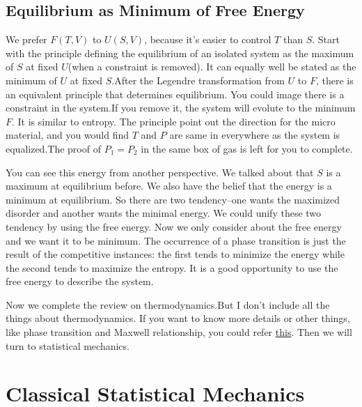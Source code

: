 \documentclass[10pt]{article}
\begin{document}
	\subsection{Equilibrium as Minimum of Free Energy}\label{Equilibrium as Minimum of Free Energy}
	We prefer $F(T,V)$ to $U(S,V)$, because it's easier to control $T$ than $S$. Start with the principle defining the equilibrium of an isolated system as the maximum of $S$ at fixed $U$(when a constraint is removed). It can equally well be stated as the minimum of $U$ at fixed $S$.After the Legendre transformation from $U$ to $F$, there is an equivalent principle that determines equilibrium. You could image there is a constraint in the system.If you remove it, the system will evolute to the minimum $F$. It is similar to entropy. The principle point out the direction for the micro material, and you would find $T$ and $P$ are same in everywhere as the system is equalized.The proof of $P_1=P_2$ in the same box of gas is left for you to complete.
	
	You can see this energy from another perspective. We talked about that $S$ is a maximum at equilibrium before. We also have the belief that the energy is a minimum at equilibrium. So there are two tendency--one wants the maximized disorder and another wants the minimal energy. We could unify these two tendency by using the free energy. Now we only consider about the free energy and we want it to be minimum. The occurrence of a phase transition is just the result of the competitive
	instances: the first tends to minimize the energy while the second tends to maximize the entropy. It is a good opportunity to use the free energy to describe the system.
	
	Now we complete the review on thermodynamics.But I don't include all the things about thermodynamics. If you want to know more details or other things, like phase transition and Maxwell relationship, you could refer \href{http://home.ustc.edu.cn/~liqinxun/}{this}. Then we will turn to statistical mechanics.
	
	\section{Classical Statistical Mechanics}
\end{document}
